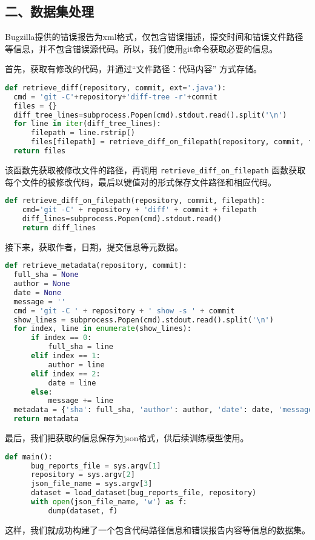 \documentclass[12pt]{article}
\begin{document}
\subsection*{二、数据集处理}
Bugzilla提供的错误报告为xml格式，仅包含错误描述，提交时间和错误文件路径等信息，并不包含错误源代码。所以，我们使用git命令获取必要的信息。

首先，获取有修改的代码，并通过``文件路径：代码内容'' 方式存储。
\begin{lstlisting}[language=Python]
def retrieve_diff(repository, commit, ext='.java'):
  cmd = 'git -C'+repository+'diff-tree -r'+commit
  files = {}
  diff_tree_lines=subprocess.Popen(cmd).stdout.read().split('\n')
  for line in iter(diff_tree_lines):
      filepath = line.rstrip()
      files[filepath] = retrieve_diff_on_filepath(repository, commit, filepath)
  return files
\end{lstlisting}
该函数先获取被修改文件的路径，再调用 \texttt{retrieve\_diff\_on\_filepath} 函数获取每个文件的被修改代码，最后以键值对的形式保存文件路径和相应代码。
\begin{lstlisting}[language=Python]
def retrieve_diff_on_filepath(repository, commit, filepath):
    cmd='git -C' + repository + 'diff' + commit + filepath
    diff_lines=subprocess.Popen(cmd).stdout.read()
    return diff_lines
\end{lstlisting}

接下来，获取作者，日期，提交信息等元数据。
\begin{lstlisting}[language=Python]
def retrieve_metadata(repository, commit): 
  full_sha = None
  author = None
  date = None
  message = ''
  cmd = 'git -C ' + repository + ' show -s ' + commit
  show_lines = subprocess.Popen(cmd).stdout.read().split('\n')
  for index, line in enumerate(show_lines):
      if index == 0:
          full_sha = line
      elif index == 1:
          author = line
      elif index == 2:
          date = line
      else:
          message += line
  metadata = {'sha': full_sha, 'author': author, 'date': date, 'message': message}
  return metadata
\end{lstlisting}
最后，我们把获取的信息保存为json格式，供后续训练模型使用。
\begin{lstlisting}[language=Python]
def main():
      bug_reports_file = sys.argv[1]
      repository = sys.argv[2]
      json_file_name = sys.argv[3]
      dataset = load_dataset(bug_reports_file, repository)
      with open(json_file_name, 'w') as f:
          dump(dataset, f)
\end{lstlisting}
这样，我们就成功构建了一个包含代码路径信息和错误报告内容等信息的数据集。
\end{document}
